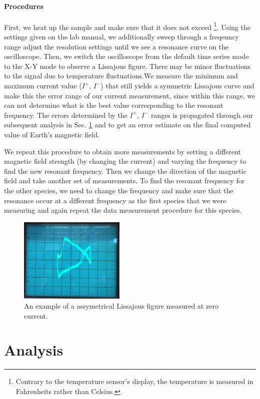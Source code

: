\documentclass{sigchi}
\begin{document}
\paragraph{Procedures}
First, we heat up the sample and make sure that it does not exceed \footnote{Contrary to the temperature sensor's display, the temperature is measured in Fahrenheits rather than Celsius.}. Using the settings given on the lab manual, we additionally sweep through a freqeuncy  range adjust the resolution settings  until we see a resonance curve on the oscilloscope. Then, we switch the oscilloscope from the default time series mode to the X-Y mode to observe a Lissajous figure. There may be minor fluctuations to the signal due to temperature fluctuations.We measure the minimum and maximum current value ($I^+$, $I^-$) that still yields a symmetric Lissajous curve and make this the error range of our current measurement, since within this range, we can not determine what is the best value corresponding to the resonant frequency. The errors determined by the $I^+$, $I^-$ ranges is propagated through our subsequent analysis in Sec. \ref{sec:analysis} and to get an error estimate on the final computed value of Earth's magnetic field. 
\par We repeat this procedure to obtain more measurements by setting a different magnetic field strength (by changing the current) and varying the frequency to find the new resonant frequency. Then we change the direction of the magnetic field and take another set of measurements. To find the resonant frequency for the other species, we need to change the frequency and make sure that the resonance occur at a different frequency as the first species that we were measuring and again repeat the data measurement procedure for this species.
 \begin{figure}[h]
\includegraphics[width=0.45\textwidth]{plots/curve_pic.png}
\caption{An example of a assymetrical Lissajous figure measured at zero current.}
\label{lissa}
\end{figure}
\section{Analysis}\label{sec:analysis}
\end{document}
